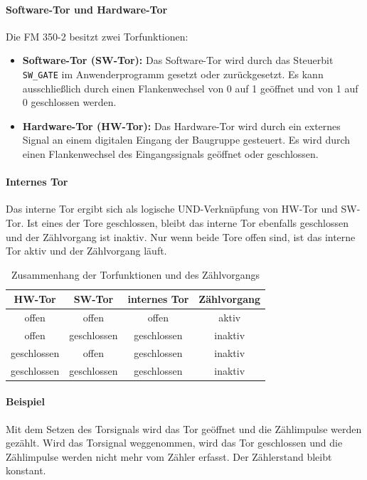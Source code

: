\paragraph{Software-Tor und Hardware-Tor}
Die FM 350-2 besitzt zwei Torfunktionen:
\begin{itemize}
    \item \textbf{Software-Tor (SW-Tor):} Das Software-Tor wird durch das Steuerbit \texttt{SW\_GATE} im Anwenderprogramm gesetzt oder zurückgesetzt. Es kann ausschließlich durch einen Flankenwechsel von 0 auf 1 geöffnet und von 1 auf 0 geschlossen werden.
    \item \textbf{Hardware-Tor (HW-Tor):} Das Hardware-Tor wird durch ein externes Signal an einem digitalen Eingang der Baugruppe gesteuert. Es wird durch einen Flankenwechsel des Eingangssignals geöffnet oder geschlossen.
\end{itemize}

\paragraph{Internes Tor}
Das interne Tor ergibt sich als logische UND-Verknüpfung von HW-Tor und SW-Tor. Ist eines der Tore geschlossen, bleibt das interne Tor ebenfalls geschlossen und der Zählvorgang ist inaktiv. Nur wenn beide Tore offen sind, ist das interne Tor aktiv und der Zählvorgang läuft.

\begin{table}[H]
    \centering
    \begin{tabular}{|c|c|c|c|}
        \hline
        HW-Tor & SW-Tor & internes Tor & Zählvorgang \\
        \hline
        offen & offen & offen & aktiv \\
        offen & geschlossen & geschlossen & inaktiv \\
        geschlossen & offen & geschlossen & inaktiv \\
        geschlossen & geschlossen & geschlossen & inaktiv \\
        \hline
    \end{tabular}
    \caption{Zusammenhang der Torfunktionen und des Zählvorgangs \cite{fm350_Handbuch}}
    \label{tab:torfunktionen}
\end{table}

\paragraph{Beispiel}
Mit dem Setzen des Torsignals wird das Tor geöffnet und die Zählimpulse werden gezählt. Wird das Torsignal weggenommen, wird das Tor geschlossen und die Zählimpulse werden nicht mehr vom Zähler erfasst. Der Zählerstand bleibt konstant.

